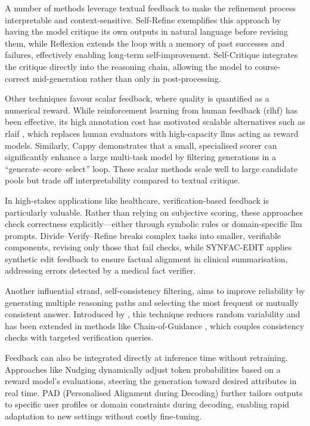 A number of methods leverage textual feedback to make the refinement process interpretable and context-sensitive. Self-Refine \citep{madaan2023selfrefine} exemplifies this approach by having the model critique its own outputs in natural language before revising them, while Reflexion \citep{shinn2023reflexion} extends the loop with a memory of past successes and failures, effectively enabling long-term self-improvement. Self-Critique \citep{tan2023selfcriticism} integrates the critique directly into the reasoning chain, allowing the model to course-correct mid-generation rather than only in post-processing.

Other techniques favour scalar feedback, where quality is quantified as a numerical reward. While reinforcement learning from human feedback (\gls{rlhf}) has been effective, its high annotation cost has motivated scalable alternatives such as \gls{rlaif} \citep{lee2023rlaif}, which replaces human evaluators with high-capacity \glspl{llm} acting as reward models. Similarly, Cappy \citep{li2023cappy} demonstrates that a small, specialised scorer can significantly enhance a large multi-task model by filtering generations in a “generate–score–select” loop. These scalar methods scale well to large candidate pools but trade off interpretability compared to textual critique.

In high-stakes applications like healthcare, verification-based feedback is particularly valuable. Rather than relying on subjective scoring, these approaches check correctness explicitly—either through symbolic rules or domain-specific \gls{llm} prompts. Divide–Verify–Refine \citep{zhang2024divideverifyrefine} breaks complex tasks into smaller, verifiable components, revising only those that fail checks, while SYNFAC-EDIT \citep{miller2024synfacedit} applies synthetic edit feedback to ensure factual alignment in clinical summarisation, addressing errors detected by a medical fact verifier.

Another influential strand, self-consistency filtering, aims to improve reliability by generating multiple reasoning paths and selecting the most frequent or mutually consistent answer. Introduced by \citet{wang2023selfconsistency}, this technique reduces random variability and has been extended in methods like Chain-of-Guidance \citep{raj2024chainofguidance}, which couples consistency checks with targeted verification queries.

Feedback can also be integrated directly at inference time without retraining. Approaches like Nudging \citep{fei2024nudging} dynamically adjust token probabilities based on a reward model’s evaluations, steering the generation toward desired attributes in real time. PAD (Personalised Alignment during Decoding) \citep{chen2025pad} further tailors outputs to specific user profiles or domain constraints during decoding, enabling rapid adaptation to new settings without costly fine-tuning.

